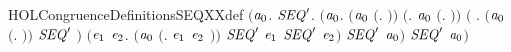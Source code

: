 \begin{SaveVerbatim}{HOLCongruenceDefinitionsSEQXXdef}
\HOLTokenTurnstile{}  \HOLSymConst{\ensuremath{=}}
   \ensuremath{(}\HOLTokenLambda{}\ensuremath{\HOLBoundVar{a}\sb{\mathrm{0}}}.
        \HOLSymConst{\HOLTokenForall{}}\ensuremath{\HOLBoundVar{SEQ}\sp{\prime}}.
            \ensuremath{(}\HOLSymConst{\HOLTokenForall{}}\ensuremath{\HOLBoundVar{a}\sb{\mathrm{0}}}.
                 \ensuremath{(}\ensuremath{\HOLBoundVar{a}\sb{\mathrm{0}}} \HOLSymConst{\ensuremath{=}} \ensuremath{(}\HOLTokenLambda{}. \ensuremath{)}\ensuremath{)} \HOLSymConst{\HOLTokenDisj{}} \ensuremath{(}\HOLSymConst{\HOLTokenExists{}}. \ensuremath{\HOLBoundVar{a}\sb{\mathrm{0}}} \HOLSymConst{\ensuremath{=}} \ensuremath{(}\HOLTokenLambda{}. \ensuremath{)}\ensuremath{)} \HOLSymConst{\HOLTokenDisj{}}
                 \ensuremath{(}\HOLSymConst{\HOLTokenExists{}} . \ensuremath{(}\ensuremath{\HOLBoundVar{a}\sb{\mathrm{0}}} \HOLSymConst{\ensuremath{=}} \ensuremath{(}\HOLTokenLambda{}. \HOLSymConst{\ensuremath{\ldotp}} \ensuremath{)}\ensuremath{)} \HOLSymConst{\HOLTokenConj{}} \ensuremath{\HOLBoundVar{SEQ}\sp{\prime}} \ensuremath{)} \HOLSymConst{\HOLTokenDisj{}}
                 \ensuremath{(}\HOLSymConst{\HOLTokenExists{}}\ensuremath{\HOLBoundVar{e}\sb{\mathrm{1}}} \ensuremath{\HOLBoundVar{e}\sb{\mathrm{2}}}.
                      \ensuremath{(}\ensuremath{\HOLBoundVar{a}\sb{\mathrm{0}}} \HOLSymConst{\ensuremath{=}} \ensuremath{(}\HOLTokenLambda{}. \ensuremath{\HOLBoundVar{e}\sb{\mathrm{1}}}  \HOLSymConst{\ensuremath{+}} \ensuremath{\HOLBoundVar{e}\sb{\mathrm{2}}} \ensuremath{)}\ensuremath{)} \HOLSymConst{\HOLTokenConj{}} \ensuremath{\HOLBoundVar{SEQ}\sp{\prime}} \ensuremath{\HOLBoundVar{e}\sb{\mathrm{1}}} \HOLSymConst{\HOLTokenConj{}}
                      \ensuremath{\HOLBoundVar{SEQ}\sp{\prime}} \ensuremath{\HOLBoundVar{e}\sb{\mathrm{2}}}\ensuremath{)} \HOLSymConst{\HOLTokenImp{}}
                 \ensuremath{\HOLBoundVar{SEQ}\sp{\prime}} \ensuremath{\HOLBoundVar{a}\sb{\mathrm{0}}}\ensuremath{)} \HOLSymConst{\HOLTokenImp{}}
            \ensuremath{\HOLBoundVar{SEQ}\sp{\prime}} \ensuremath{\HOLBoundVar{a}\sb{\mathrm{0}}}\ensuremath{)}
\end{SaveVerbatim}
\newcommand{\HOLCongruenceDefinitionsSEQXXdef}{\UseVerbatim{HOLCongruenceDefinitionsSEQXXdef}}
